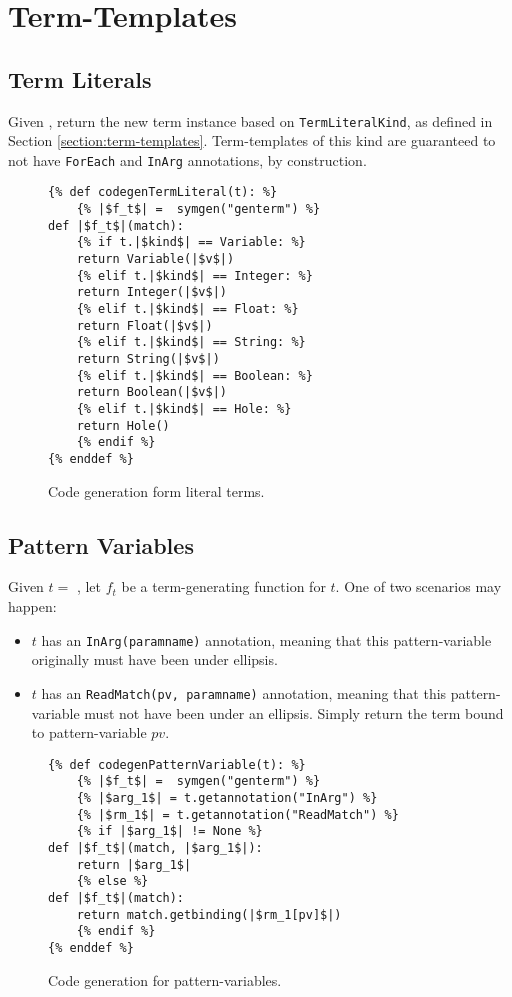 \section{Term-Templates}

\subsection{Term Literals}

Given \TermLiteral, return the new term instance based on \texttt{TermLiteralKind}, as defined in Section \ref{section:term-templates}. Term-templates of this kind are guaranteed to not have \texttt{ForEach} and \texttt{InArg} annotations, by construction.

\begin{figure}[ht]
\begin{verbatim}
{% def codegenTermLiteral(t): %}
	{% |$f_t$| =  symgen("genterm") %}
def |$f_t$|(match):
	{% if t.|$kind$| == Variable: %}
	return Variable(|$v$|)
	{% elif t.|$kind$| == Integer: %}
	return Integer(|$v$|)
	{% elif t.|$kind$| == Float: %}
	return Float(|$v$|)
	{% elif t.|$kind$| == String: %}
	return String(|$v$|)
	{% elif t.|$kind$| == Boolean: %}
	return Boolean(|$v$|)
	{% elif t.|$kind$| == Hole: %}
	return Hole()
	{% endif %}
{% enddef %}
\end{verbatim}
\caption{Code generation form literal terms.}
\label{codegen-term-template-lit}
\end{figure}

\subsection{Pattern Variables}

Given $t =$ \PatternVariable, let $f_t$ be a term-generating function for $t$. One of two scenarios may happen:
\begin{itemize}
\item $t$ has an \texttt{InArg(paramname)} annotation, meaning that this pattern-variable originally must have been under ellipsis.
\item $t$ has an \texttt{ReadMatch(pv, paramname)} annotation, meaning that this pattern-variable must not have been under an ellipsis. Simply return the term bound to pattern-variable $pv$.
\end{itemize}

\begin{figure}[htb]
\begin{verbatim}
{% def codegenPatternVariable(t): %}
	{% |$f_t$| =  symgen("genterm") %}
	{% |$arg_1$| = t.getannotation("InArg") %}
	{% |$rm_1$| = t.getannotation("ReadMatch") %}
	{% if |$arg_1$| != None %}
def |$f_t$|(match, |$arg_1$|):
	return |$arg_1$|
	{% else %}
def |$f_t$|(match):
	return match.getbinding(|$rm_1[pv]$|)
	{% endif %}
{% enddef %}
\end{verbatim}
\caption{Code generation for pattern-variables.}
\label{codegen-term-pv}
\end{figure}

